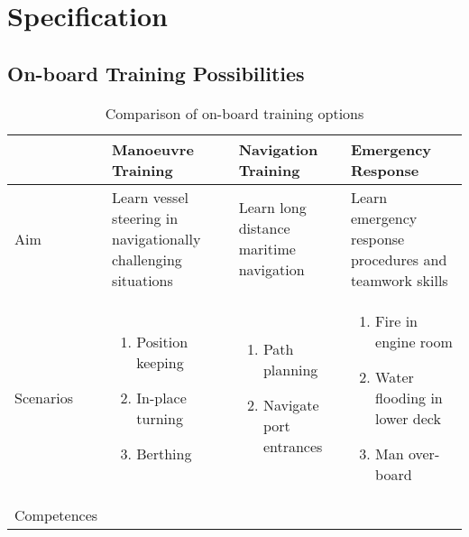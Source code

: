 \chapter{Specification}

\section{On-board Training Possibilities}
\begin{table}[h]
\centering
\caption{Comparison of on-board training options}
\label{tab:trainingoptions}
\begin{tabular}{@{}p{2.2cm}|p{3.8cm}p{3.2cm}p{3.2cm}@{}}
\toprule
\multicolumn{1}{c|}{ } & \multicolumn{1}{p{3cm}}{\textbf{Manoeuvre Training}} & \multicolumn{1}{p{3cm}}{\textbf{Navigation Training}} & \multicolumn{1}{p{2.5cm}}{\textbf{Emergency Response}} \\ 
\hline
Aim & Learn vessel steering in navigationally challenging situations & Learn long distance maritime navigation & Learn emergency response procedures and teamwork skills \\
\hline
Scenarios &
\vspace{-2mm} \begin{enumerate}[nosep,leftmargin=*,topsep=0pt,partopsep=0pt,align=left,itemsep=0cm]
\item Position keeping  
\item In-place turning
\item Berthing  
\end{enumerate}
&\vspace{-2mm} \begin{enumerate}[nosep,leftmargin=*,topsep=0pt,partopsep=0pt,align=left,itemsep=0cm]
\item Path planning 
\item Navigate port entrances
\end{enumerate}
& \vspace{-2mm} \begin{enumerate}[nosep,leftmargin=*,topsep=0pt,partopsep=0pt,align=left,itemsep=0cm]
\item Fire in engine room 
\item Water flooding in lower deck
\item Man over-board
\end{enumerate} \vspace{-\baselineskip} \\
\hline
Competences & \vspace{-2mm}\begin{enumerate}[nosep,leftmargin=*,topsep=0pt,partopsep=0pt,align=left,itemsep=0cm]

\end{enumerate}
\end{tabular}
\end{table}
